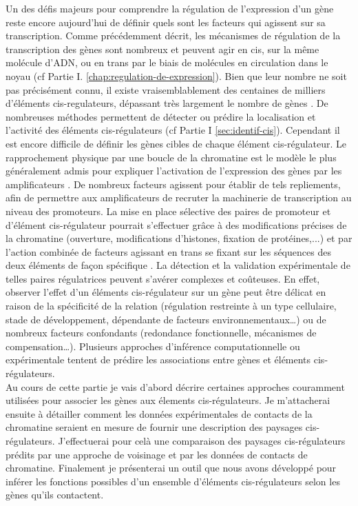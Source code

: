 \newpage
Un des défis majeurs pour comprendre la régulation de l’expression d’un gène reste encore aujourd’hui de définir quels sont les facteurs qui agissent sur sa transcription. Comme précédemment décrit, les mécanismes de régulation de la transcription des gènes sont nombreux et peuvent agir en \gls{cis}, sur la même molécule d’ADN, ou en \gls{trans} par le biais de molécules en circulation dans le noyau (cf Partie I. \ref{chap:regulation-de-expression}). Bien que leur nombre ne soit pas précisément connu, il existe vraisemblablement des centaines de milliers d’éléments \gls{cis}-regulateurs, dépassant très largement le nombre de gènes \citep{encode_project_consortium_integrated_2012}. De nombreuses méthodes permettent de détecter ou prédire la localisation et l’activité des éléments \gls{cis}-régulateurs (cf Partie I \ref{sec:identif-cis}). Cependant il est encore difficile de définir les gènes cibles de chaque élément \gls{cis}-régulateur. Le rapprochement physique par une boucle de la chromatine est le modèle le plus généralement admis pour expliquer l’activation de l’expression des gènes par les \glspl{amplificateur} \citep{blackwood_going_1998,bulger_looping_1999, marsman_long_2012}. De nombreux facteurs agissent pour établir de tels repliements, afin de permettre aux \glspl{amplificateur} de recruter la machinerie de transcription au niveau des promoteurs. La mise en place sélective des paires de promoteur et d’élément \gls{cis}-régulateur pourrait s’effectuer grâce à des modifications précises de la chromatine (ouverture, modifications d’histones, fixation de protéines,...) et par l’action combinée de facteurs agissant en \gls{trans} se fixant sur les séquences des deux éléments de façon spécifique \citep{ernst_interplay_2013}. La détection et la validation expérimentale de telles paires régulatrices peuvent s’avérer complexes et coûteuses. En effet, observer l’effet d’un éléments \gls{cis}-régulateur sur un gène peut être délicat en raison de la spécificité de la relation (régulation restreinte à un type cellulaire, stade de développement, dépendante de facteurs environnementaux…) ou de nombreux facteurs confondants (redondance fonctionnelle, mécanismes de compensation…). Plusieurs approches d’inférence computationnelle ou expérimentale tentent de prédire les associations entre gènes et éléments \gls{cis}-régulateurs.\\

Au cours de cette partie je vais d’abord décrire certaines approches couramment utilisées pour associer les gènes aux élements \gls{cis}-régulateurs. Je m’attacherai ensuite à détailler comment les données expérimentales de contacts de la chromatine seraient en mesure de fournir une description des paysages \gls{cis}-régulateurs. J’effectuerai pour celà une comparaison des paysages \gls{cis}-régulateurs prédits par une approche de voisinage et par les données de contacts de chromatine. Finalement je présenterai un outil que nous avons développé pour inférer les fonctions possibles d’un ensemble d’éléments \gls{cis}-régulateurs selon les gènes qu’ils contactent.

